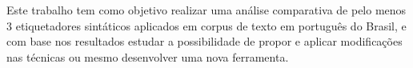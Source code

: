 Este trabalho tem como objetivo realizar uma análise comparativa de pelo menos 3 etiquetadores sintáticos aplicados em corpus de texto em português do Brasil, e com base nos resultados estudar a possibilidade de propor e aplicar modificações nas técnicas ou mesmo desenvolver uma nova ferramenta.